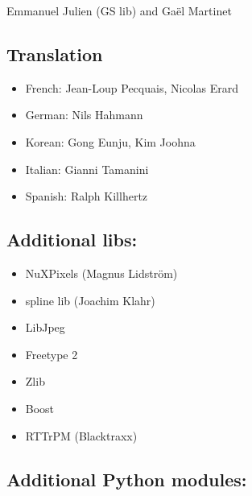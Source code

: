 \documentclass[
  letterpaper,
  DIV=11,
  numbers=noendperiod]{scrreport}
\providecommand{\tightlist}{%
  \setlength{\itemsep}{0pt}\setlength{\parskip}{0pt}}\usepackage{longtable,booktabs,array}
\begin{document}
Emmanuel Julien (GS lib) and Gaël Martinet

\hypertarget{translation}{%
\subsection{Translation}\label{translation}}

\begin{itemize}
\tightlist
\item
  French: Jean-Loup Pecquais, Nicolas Erard
\item
  German: Nils Hahmann
\item
  Korean: Gong Eunju, Kim Joohna
\item
  Italian: Gianni Tamanini
\item
  Spanish: Ralph Killhertz
\end{itemize}

\hypertarget{additional-libs}{%
\subsection{Additional libs:}\label{additional-libs}}

\begin{itemize}
\tightlist
\item
  NuXPixels (Magnus Lidström)
\item
  spline lib (Joachim Klahr)
\item
  LibJpeg
\item
  Freetype 2
\item
  Zlib
\item
  Boost
\item
  RTTrPM (Blacktraxx)
\end{itemize}

\hypertarget{additional-python-modules}{%
\subsection{Additional Python
modules:}\label{additional-python-modules}}
\end{document}
